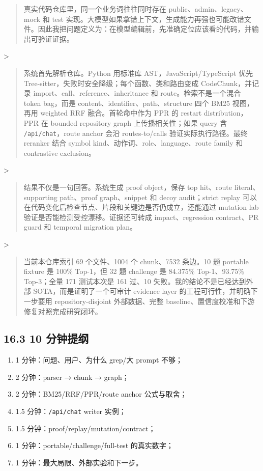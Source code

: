 \documentclass[UTF8,12pt,openany]{ctexbook}
\begin{document}
\begin{quote}
真实代码仓库里，同一个业务词往往同时存在 public、admin、legacy、mock 和 test 实现。大模型如果拿错上下文，生成能力再强也可能改错文件。因此我把问题定义为：在模型编辑前，先准确定位应该看的代码，并输出可验证证据。
\end{quote}
>\par
\begin{quote}
系统首先解析仓库。Python 用标准库 AST，JavaScript/TypeScript 优先 Tree-sitter，失败时安全降级；每个函数、类和路由变成 CodeChunk，并记录 import、call、reference、inheritance 和 route。检索不是一个混合 token bag，而是 content、identifier、path、structure 四个 BM25 视图，再用 weighted RRF 融合。首轮命中作为 PPR 的 restart distribution，PPR 在 bounded repository graph 上传播相关性；如果 query 含 \texttt{/api/chat}，route anchor 会沿 routes-to/calls 验证实际执行路径。最终 reranker 结合 symbol kind、动作词、role、language、route family 和 contrastive exclusion。
\end{quote}
>\par
\begin{quote}
结果不仅是一句回答。系统生成 proof object，保存 top hit、route literal、supporting path、proof graph、snippet 和 decoy audit；strict replay 可以在代码变化后检查节点、片段和关键边是否仍成立，还能通过 mutation lab 验证是否能检测受控漂移。证据还可转成 impact、regression contract、PR guard 和 temporal migration plan。
\end{quote}
>\par
\begin{quote}
当前本仓库索引 69 个文件、1004 个 chunk、7532 条边。10 题 portable fixture 是 100\% Top-1，但 32 题 challenge 是 84.375\% Top-1、93.75\% Top-3；全量 171 测试本次是 161 过、10 失败。我的结论不是已经达到外部 SOTA，而是证明了一个可审计 evidence layer 的工程可行性，并明确下一步要用 repository-disjoint 外部数据、完整 baseline、置信度校准和下游修复对照完成研究闭环。
\end{quote}

\subsection{16.3 10 分钟提纲}

\begin{enumerate}
\item 1 分钟：问题、用户、为什么 grep/大 prompt 不够；
\item 2 分钟：parser → chunk → graph；
\item 2 分钟：BM25/RRF/PPR/route anchor 公式与取舍；
\item 1.5 分钟：\texttt{/api/chat} writer 实例；
\item 1.5 分钟：proof/replay/mutation/contract；
\item 1 分钟：portable/challenge/full-test 的真实数字；
\item 1 分钟：最大局限、外部实验和下一步。
\end{enumerate}
\end{document}
